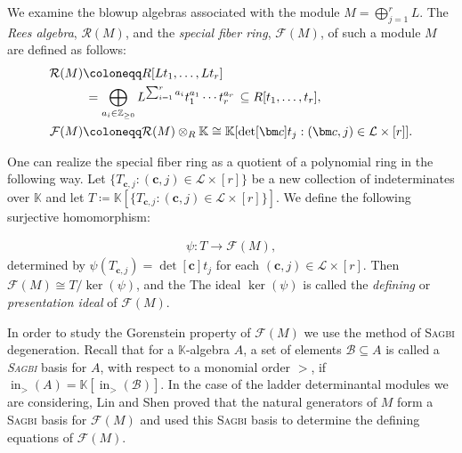 \documentclass[11pt,a4paper,reqno,dvipsnames]{amsart}
\theoremstyle{plain}
\theoremstyle{definition}
\newtheorem{Assumptions and Discussion}[Theorem]{Assumptions and Discussion}
\theoremstyle{remark}
\def\ini{\operatorname{in}}
\def\ker{\operatorname{ker}}
\def\KK{{\mathbb K}}
\newcommand\bdc{{\bm c}}
\newcommand\calB{\mathcal{B}}
\newcommand\calF{\mathcal{F}}
\newcommand\calL{\mathcal{L}}
\newcommand\calR{\mathcal{R}}
\newcommand{\Lr}{\ensuremath{\calL\times[r]}}
\begin{document}
 We examine the blowup algebras associated with the module $M= \bigoplus_{j=1}^r L$. 
The \emph{Rees algebra}, $\mathcal{R}(M)$, and the \emph{special fiber ring}, $\mathcal{F}(M)$, of such a module $M$ are defined as follows: 
\begin{align*}
\mathcal{R}(M) &\coloneqq R[L t_1, \ldots, L t_r ] \\
& \, =\bigoplus_{a_i \in \mathbb{Z}_{\ge 0}} L^{\sum_{i=1}^ra_i}t_1^{a_1}\cdots t_r^{a_r} 
   \, \subseteq R[t_1,\ldots,t_r], \\ 
   \smallskip
\mathcal{F}(M) & \coloneqq \calR(M) \otimes_R \KK  \cong \KK[\det[\bdc]t_j : (\bdc,j)\in \Lr ].\\   
\end{align*}  


One can realize the special fiber ring as a quotient of a polynomial ring in the following way.
Let $\{T_{\bdc,j}: (\bdc,j)\in \Lr\}$ be a new collection of indeterminates over $\KK$ and let  $T\coloneq \KK[\{T_{\bdc,j}: (\bdc,j)\in \Lr \}]$. We define the following surjective homomorphism: 

\begin{align*}
     \psi: T \longrightarrow \mathcal{F}(M),
\end{align*}
determined by $\psi(T_{\bdc,j})=\det[\bdc]t_j$ for each  $(\bdc,j)\in \Lr$.
Then $\calF(M)\cong T/\ker (\psi)$, and the
The ideal $\ker (\psi)$ is called the \emph{defining} or \emph{presentation ideal} of $\mathcal{F}(M)$. 



In order to study the Gorenstein property of $\calF(M)$ we use the method of \textsc{Sagbi} degeneration. 
Recall that for a $\KK$-algebra  $A$, a set of elements $\calB\subseteq A$  is called a \emph{\textsc{Sagbi}} basis for $A$, with respect to a monomial order $>$, if $\ini_>(A) = \KK[\ini_>(\calB)]$. In the case of the ladder determinantal modules we are considering, Lin and Shen proved that the natural generators of $M$ form a \textsc{Sagbi} basis for $\calF(M)$ and used this \textsc{Sagbi} basis to determine the defining equations of $\calF(M)$.
\end{document}
